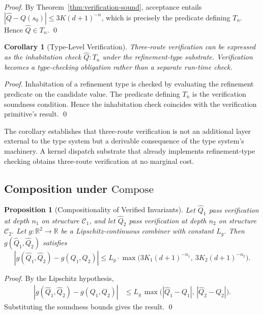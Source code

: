 \documentclass[twocolumn,11pt,a4paper]{article}
\newtheorem{corollary}[theorem]{Corollary}
\newtheorem{proposition}[theorem]{Proposition}
\newcommand{\Real}{\mathbb{R}}
\newcommand{\Inv}{Q}
\newcommand{\Depth}{n}
\newcommand{\Dim}{d}
\newcommand{\Tolb}{K}
\begin{document}
\begin{proof}
By Theorem~\ref{thm:verification-sound}, acceptance entails $|\hat\Inv - \Inv(s_0)| \leq 3\Tolb(\Dim+1)^{-\Depth}$, which is precisely the predicate defining $T_\Depth$. Hence $\hat\Inv \in T_\Depth$. \qed
\end{proof}

\begin{corollary}[Type-Level Verification]
\label{cor:type-level}
Three-route verification can be expressed as the inhabitation check $\hat\Inv : T_\Depth$ under the refinement-type substrate. Verification becomes a type-checking obligation rather than a separate run-time check.
\end{corollary}

\begin{proof}
Inhabitation of a refinement type is checked by evaluating the refinement predicate on the candidate value. The predicate defining $T_\Depth$ is the verification soundness condition. Hence the inhabitation check coincides with the verification primitive's result. \qed
\end{proof}

The corollary establishes that three-route verification is not an additional layer external to the type system but a derivable consequence of the type system's machinery. A kernel dispatch substrate that already implements refinement-type checking obtains three-route verification at no marginal cost.

\subsection{Composition under \texorpdfstring{$\mathrm{Compose}$}{Compose}}

\begin{proposition}[Compositionality of Verified Invariants]
\label{prop:compose-verified}
Let $\hat\Inv_1$ pass verification at depth $\Depth_1$ on structure $\mathcal{C}_1$, and let $\hat\Inv_2$ pass verification at depth $\Depth_2$ on structure $\mathcal{C}_2$. Let $g : \Real^2 \to \Real$ be a Lipschitz-continuous combiner with constant $L_g$. Then $g(\hat\Inv_1, \hat\Inv_2)$ satisfies
\[
|g(\hat\Inv_1, \hat\Inv_2) - g(\Inv_1, \Inv_2)| \leq L_g \cdot \max\bigl(3\Tolb_1(\Dim+1)^{-\Depth_1},\ 3\Tolb_2(\Dim+1)^{-\Depth_2}\bigr).
\]
\end{proposition}

\begin{proof}
By the Lipschitz hypothesis,
\begin{align*}
|g(\hat\Inv_1, \hat\Inv_2) - g(\Inv_1, \Inv_2)|
&\leq L_g\, \max\bigl(|\hat\Inv_1 - \Inv_1|,\, |\hat\Inv_2 - \Inv_2|\bigr).
\end{align*}
Substituting the soundness bounds gives the result. \qed
\end{proof}
\end{document}
